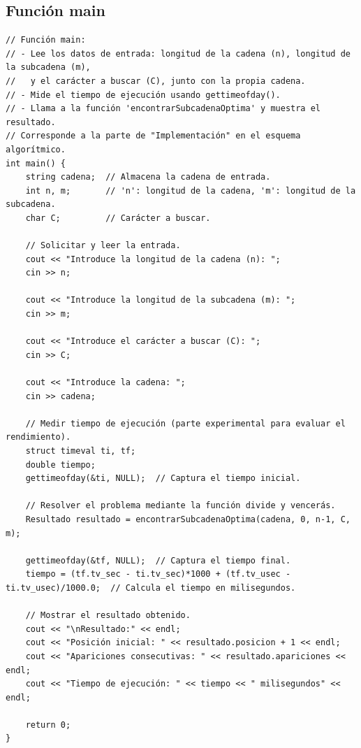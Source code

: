 \documentclass[12pt,a4paper]{article}
\begin{document}
\subsection{Función main}
\begin{lstlisting}[caption=Función main]
// Función main:
// - Lee los datos de entrada: longitud de la cadena (n), longitud de la subcadena (m),
//   y el carácter a buscar (C), junto con la propia cadena.
// - Mide el tiempo de ejecución usando gettimeofday().
// - Llama a la función 'encontrarSubcadenaOptima' y muestra el resultado.
// Corresponde a la parte de "Implementación" en el esquema algorítmico.
int main() {
    string cadena;  // Almacena la cadena de entrada.
    int n, m;       // 'n': longitud de la cadena, 'm': longitud de la subcadena.
    char C;         // Carácter a buscar.
    
    // Solicitar y leer la entrada.
    cout << "Introduce la longitud de la cadena (n): ";
    cin >> n;
    
    cout << "Introduce la longitud de la subcadena (m): ";
    cin >> m;
    
    cout << "Introduce el carácter a buscar (C): ";
    cin >> C;
    
    cout << "Introduce la cadena: ";
    cin >> cadena;
    
    // Medir tiempo de ejecución (parte experimental para evaluar el rendimiento).
    struct timeval ti, tf;
    double tiempo;
    gettimeofday(&ti, NULL);  // Captura el tiempo inicial.
    
    // Resolver el problema mediante la función divide y vencerás.
    Resultado resultado = encontrarSubcadenaOptima(cadena, 0, n-1, C, m);
    
    gettimeofday(&tf, NULL);  // Captura el tiempo final.
    tiempo = (tf.tv_sec - ti.tv_sec)*1000 + (tf.tv_usec - ti.tv_usec)/1000.0;  // Calcula el tiempo en milisegundos.
    
    // Mostrar el resultado obtenido.
    cout << "\nResultado:" << endl;
    cout << "Posición inicial: " << resultado.posicion + 1 << endl;
    cout << "Apariciones consecutivas: " << resultado.apariciones << endl;
    cout << "Tiempo de ejecución: " << tiempo << " milisegundos" << endl;
    
    return 0;
}
\end{lstlisting}
\end{document}
